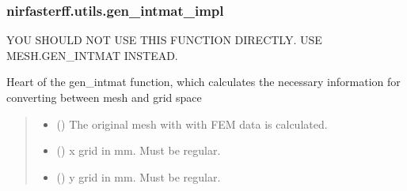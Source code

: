 \documentclass[letterpaper,10pt,english]{sphinxmanual}
\begin{document}
\sphinxstepscope


\subsubsection{nirfasterff.utils.gen\_intmat\_impl}
\label{\detokenize{_autosummary/nirfasterff.utils.gen_intmat_impl:nirfasterff-utils-gen-intmat-impl}}\label{\detokenize{_autosummary/nirfasterff.utils.gen_intmat_impl::doc}}

\begin{fulllineitems}
\label{\detokenize{_autosummary/nirfasterff.utils.gen_intmat_impl:nirfasterff.utils.gen_intmat_impl}}
\pysigstartsignatures
\pysiglinewithargsret
{}
{\sphinxparamcomma {}\sphinxparamcomma {}\sphinxparamcomma {}}
{}
\pysigstopsignatures
\sphinxAtStartPar
YOU SHOULD NOT USE THIS FUNCTION DIRECTLY. USE MESH.GEN\_INTMAT INSTEAD.

\sphinxAtStartPar
Heart of the gen\_intmat function, which calculates the necessary information for converting between mesh and grid space
\begin{quote}\begin{description}
\begin{itemize}
\item {} 
\sphinxAtStartPar
{} () \textendash{} The original mesh with with FEM data is calculated.

\item {} 
\sphinxAtStartPar
{} () \textendash{} x grid in mm. Must be regular.

\item {} 
\sphinxAtStartPar
{} () \textendash{} y grid in mm. Must be regular.


\end{itemize}
\end{description}
\end{quote}
\end{fulllineitems}
\end{document}
